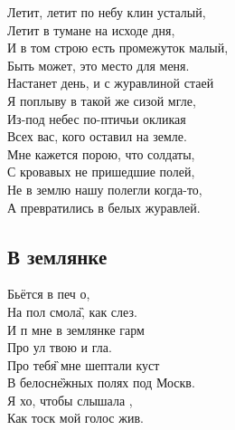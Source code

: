 \documentclass[fleqn,a5paper,12pt,twoside]{guitartabs}
\begin{document}
    \-\hspace{3mm}\-\hspace{3mm}Летит, летит по небу клин усталый,\\
    \-\hspace{3mm}\-\hspace{3mm}Летит в тумане на исходе дня,\\
    \-\hspace{3mm}\-\hspace{3mm}И в том строю есть промежуток малый, \\
    \-\hspace{3mm}\-\hspace{3mm}Быть может, это место для меня.\\
    \-\hspace{3mm}\-\hspace{3mm}Настанет день, и с журавлиной стаей \\
    \-\hspace{3mm}\-\hspace{3mm}Я поплыву в такой же сизой мгле,\\
    \-\hspace{3mm}\-\hspace{3mm}Из-под небес по-птичьи окликая \\
    \-\hspace{3mm}\-\hspace{3mm}Всех вас, кого оставил на земле.\\

    Мне кажется порою, что солдаты,\\
    С кровавых не пришедшие полей,\\
    Не в землю нашу полегли когда-то,\\
    А превратились в белых журавлей.\\
\newpage
{}%
\subsection*{В землянке}
    Бьётся в  печ о,\\    
    На пол смол\G{а}, как слез.\\
    И п мне в землянке гарм\\
    Про ул твою и гла.\\
    Про теб\G{я} мне шептали куст\\
    В белосн\G{ежных} полях под Москв.\\
    Я хо, чтобы слышала ,\\
    Как тоск мой голос жив.\\
    
\end{document}
